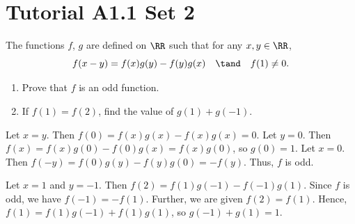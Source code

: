 \section{Tutorial A1.1 Set 2}

\begin{problem}
    The functions $f$, $g$ are defined on $\RR$ such that for any $x, y \in \RR$, \[f(x-y) = f(x)g(y) - f(y)g(x) \quad \tand \quad f(1) \neq 0.\]

    \begin{enumerate}
        \item Prove that $f$ is an odd function.
        \item If $f(1) = f(2)$, find the value of $g(1) + g(-1)$.
    \end{enumerate}
\end{problem}
\begin{solution}
    \begin{ppart}
        Let $x = y$. Then $f(0) = f(x)g(x) - f(x)g(x) = 0$. Let $y = 0$. Then $f(x) = f(x)g(0) - f(0)g(x) = f(x)g(0)$, so $g(0) = 1$. Let $x = 0$. Then $f(-y) = f(0)g(y) - f(y)g(0) = -f(y)$. Thus, $f$ is odd.
    \end{ppart}
    \begin{ppart}
        Let $x = 1$ and $y = -1$. Then $f(2) = f(1)g(-1) - f(-1)g(1)$. Since $f$ is odd, we have $f(-1) = -f(1)$. Further, we are given $f(2) = f(1)$. Hence, $f(1) = f(1)g(-1) + f(1)g(1)$, so $g(-1) + g(1) = 1$.
    \end{ppart}
\end{solution}

